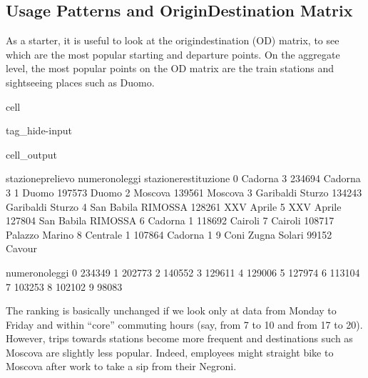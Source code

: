 \documentclass[letterpaper,10pt,english]{jupyterBook}
\begin{document}
\subsection{Usage Patterns and Origin\sphinxhyphen{}Destination Matrix}
\label{\detokenize{03-data_ingestion_and_spatial_operations:usage-patterns-and-origin-destination-matrix}}
\sphinxAtStartPar
As a starter, it is useful to look at the origin\sphinxhyphen{}destination (OD) matrix, to see which are the most popular starting and departure points. On the aggregate level, the most popular points on the OD matrix are the train stations and sightseeing places such as Duomo.

\begin{sphinxuseclass}{cell}
\begin{sphinxuseclass}{tag_hide-input}
\begin{sphinxuseclass}{cell_output}
\begin{sphinxVerbatim}[commandchars=\\\{\}]
       stazione\PYGZus{}prelievo  numero\PYGZus{}noleggi  stazione\PYGZus{}restituzione  \PYGZbs{}
0              Cadorna 3          234694              Cadorna 3   
1                  Duomo          197573                  Duomo   
2                Moscova          139561                Moscova   
3     Garibaldi \PYGZhy{} Sturzo          134243     Garibaldi \PYGZhy{} Sturzo   
4  San Babila \PYGZhy{} RIMOSSA\PYGZhy{}          128261             XXV Aprile   
5             XXV Aprile          127804  San Babila \PYGZhy{} RIMOSSA\PYGZhy{}   
6              Cadorna 1          118692                Cairoli   
7                Cairoli          108717         Palazzo Marino   
8             Centrale 1          107864              Cadorna 1   
9      Coni Zugna Solari           99152                 Cavour   

   numero\PYGZus{}noleggi  
0          234349  
1          202773  
2          140552  
3          129611  
4          129006  
5          127974  
6          113104  
7          103253  
8          102102  
9           98083  
\end{sphinxVerbatim}

\end{sphinxuseclass}
\end{sphinxuseclass}
\end{sphinxuseclass}
\sphinxAtStartPar
The ranking is basically unchanged if we look only at data from Monday to Friday and within “core” commuting hours (say, from 7 to 10 and from 17 to 20). However, trips towards stations become more frequent and destinations such as Moscova are slightly less popular. Indeed, employees might straight bike to Moscova after work to take a sip from their Negroni.
\end{document}
